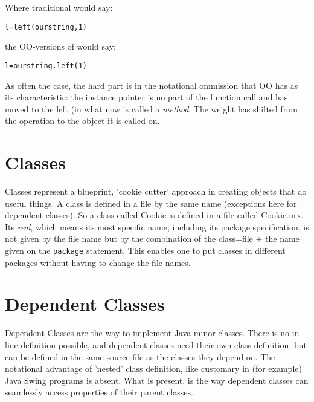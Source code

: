 {Where traditional \Rexx{} would say:
\begin{alltt}
l=left(ourstring,1)
\end{alltt}
the OO-versions of \Rexx{} would say:
\begin{alltt}
l=ourstring.left(1)
\end{alltt}
As often the case, the hard part is in the notational ommission that
OO has as its characteristic: the instance pointer is no part of the
function call and has moved to the left (in what now is called a
\emph{method}. The weight has shifted from the operation to the object
it is called on.
\section{Classes}
Classes represent a blueprint, 'cookie cutter' approach in creating
objects that do useful things. A class is defined in a file by the
same name (exceptions here for dependent classes). So a class called
Cookie is defined in a file called Cookie.nrx. Its \emph{real}, which
means its most specific name, including its package specification, is
not given by the file name but by the combination of the class=file +
the name given on the \texttt{package} statement. This enables one to
put classes in different packages without having to change the file
names.

\section{Dependent Classes}
Dependent Classes are the \nr{} way to implement Java minor
classes. There is no in-line definition possible, and dependent
classes need their own class definition, but can be defined in the
same source file as the classes they depend on. The notational
advantage of 'nested' class definition, like customary in (for
example) Java Swing programs is absent. What is present, is the way
dependent classes can seamlessly access properties of their parent classes.
}
